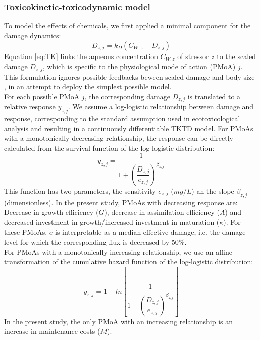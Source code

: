 \subsubsection{Toxicokinetic-toxicodynamic model}
%
To model the effects of chemicals, we first applied a minimal component for the damage dynamics: 
%
\begin{equation}
    \dot{D}_{z,j} = k_D \left( C_{W,z}  - D_{z,j} \right)
    \label{eq:TK}
\end{equation}
%
Equation \ref{eq:TK} links the aqueous concentration $C_{W,z}$ of stressor $z$ to 
the scaled damage $D_{z,j}$, which is specific to the physiological mode of action (PMoA) $j$.
This formulation ignores possible feedbacks beween scaled damage and body size \citep{jagerRevisitingSimplifiedDEBtox2020}, 
in an attempt to deploy the simplest possible model. \\ 
For each possible PMoA $j$, the corresponding damage $D_{z,j}$ is translated to a relative response $y_{z,j}$. 
We assume a log-logistic relationship between damage and response, 
corresponding to the standard assumption used in ecotoxicological analysis and resulting in a continuously differentiable 
TKTD model. 
For PMoAs with a monotonically decreasing relationship, the response can be directly calculated from the survival function 
of the log-logistic distribution:
%
\begin{equation}
    y_{z,j} = \dfrac{1}{ 1 + \left( \dfrac{D_{z,j}} {e_{z,j}} \right) ^ {\beta_{z,j}} }
    \label{eq:TD_decrease}
\end{equation}
%
This function has two parameters, the sensitivity $e_{z,j}$ ($mg/L$) an the slope $\beta_{z,j}$ (dimensionless). 
In the present study, PMoAs with decreasing response are: 
Decrease in growth efficiency ($G$), 
decrease in assimilation efficiency ($A$) 
and decreased investment in growth/increased investment in maturation ($\kappa$).
For these PMoAs, $e$ is interpretable as a median effective damage, i.e. the damage level  
for which the corresponding flux is decreased by 50\%. \\
For PMoAs with a monotonically increasing relationship, we use an affine transformation of the cumulative hazard 
function of the log-logistic distribution:
%
\begin{equation}
    y_{z,j} = 1 - ln \left[ \frac{1}{ 1 + \left( \dfrac{D_{z,j}} {e_{z,j}} \right) ^ {\beta_{z,j}} } \right]
    \label{eq:TD_increase}
\end{equation}
%
In the present study, the only PMoA with an increasing relationship is an increase in maintenance costs ($M$).
